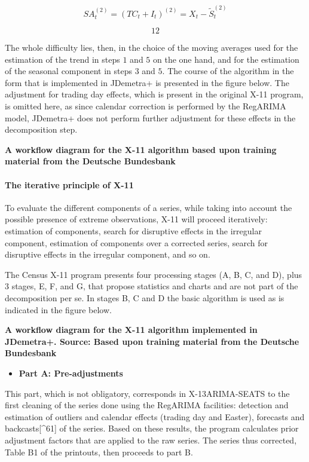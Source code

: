 \documentclass[
  letterpaper,
  DIV=11,
  numbers=noendperiod]{scrreprt}
\let\oldparagraph\paragraph
\renewcommand{\paragraph}[1]{\oldparagraph{#1}\mbox{}}
\providecommand{\tightlist}{%
  \setlength{\itemsep}{0pt}\setlength{\parskip}{0pt}}\usepackage{longtable,booktabs,array}
\begin{document}
\[SA_{t}^{\left( 2 \right)} = \left(TC_{t} + I_{t} \right)^{(2)} = X_{t} - {\widetilde{S}}_{t}^{(2)}\]

\[12\]

The whole difficulty lies, then, in the choice of the moving averages
used for the estimation of the trend in steps \(1\) and \(5\) on the one
hand, and for the estimation of the seasonal component in steps \(3\)
and \(5\). The course of the algorithm in the form that is implemented
in JDemetra+ is presented in the figure below. The adjustment for
trading day effects, which is present in the original X-11 program, is
omitted here, as since calendar correction is performed by the RegARIMA
model, JDemetra+ does not perform further adjustment for these effects
in the decomposition step.

\textbf{A workflow diagram for the X-11 algorithm based upon training
material from the Deutsche Bundesbank}

\hypertarget{the-iterative-principle-of-x-11}{%
\paragraph{\texorpdfstring{\textbf{The iterative principle of
X-11}}{The iterative principle of X-11}}\label{the-iterative-principle-of-x-11}}

To evaluate the different components of a series, while taking into
account the possible presence of extreme observations, X-11 will proceed
iteratively: estimation of components, search for disruptive effects in
the irregular component, estimation of components over a corrected
series, search for disruptive effects in the irregular component, and so
on.

The Census X-11 program presents four processing stages (A, B, C, and
D), plus 3 stages, E, F, and G, that propose statistics and charts and
are not part of the decomposition per se. In stages B, C and D the basic
algorithm is used as is indicated in the figure below.

\textbf{A workflow diagram for the X-11 algorithm implemented in
JDemetra+. Source: Based upon training material from the Deutsche
Bundesbank}

\begin{itemize}
\tightlist
\item
  \textbf{Part A: Pre-adjustments}
\end{itemize}

This part, which is not obligatory, corresponds in X-13ARIMA-SEATS to
the first cleaning of the series done using the RegARIMA facilities:
detection and estimation of outliers and calendar effects (trading day
and Easter), forecasts and backcasts{[}\^{}61{]} of the series. Based on
these results, the program calculates prior adjustment factors that are
applied to the raw series. The series thus corrected, Table B1 of the
printouts, then proceeds to part B.
\end{document}
